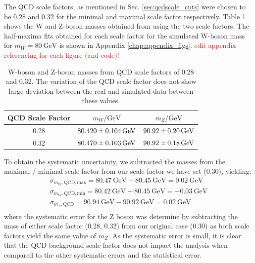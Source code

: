 \documentclass[a4paper]{report}
\numberwithin{equation}{section}
\begin{document}
The QCD scale factors, as mentioned in Sec. \ref{sec:qcdscale_cuts} were chosen to be 0.28 and 0.32 for the minimal and maximal scale 
factor respectively. Table \ref{tab:qcd_syserr} shows the W and Z-boson masses obtained from using the two scale factors. The half-maxima fits obtained for each 
scale factor for the simulated W-boson mass for $m_W = \SI{80}{\giga\electronvolt}$ is shown in Appendix \ref{chap:appendix_figs}. \textcolor{red}{edit appendix 
referencing for each figure (and code)!}

\begin{table}
    \centering
    \begin{tabular}{|c|c|c|} \hline
    QCD Scale Factor &  $m_W / \si{\giga\electronvolt}$ & $m_Z / \si{\giga\electronvolt}$\\ \hline
    0.28 & $\SI{80.42 \pm 0.104}{\giga\electronvolt}$ & $\SI{90.92 \pm 0.20}{\giga\electronvolt}$ \\ 
    0.32 & $\SI{80.47 \pm 0.103}{\giga\electronvolt}$ & $\SI{90.92 \pm 0.18}{\giga\electronvolt}$ \\ \hline
    \end{tabular}
    \caption{W-boson and Z-boson masses from QCD scale factors of 0.28 and 0.32. The variation of the QCD scale factor 
    does not show large deviation between the real and simulated data between these values.}
    \label{tab:qcd_syserr}
\end{table}

To obtain the systematic uncertainty, we subtracted the masses from the maximal / minimal scale factor from our scale 
factor we have set (0.30), yielding:
\begin{align}
    \sigma_{m_W, \mathrm{QCD, max}} = \SI{80.47}{\giga\electronvolt} - \SI{80.45}{\giga\electronvolt} = \SI{0.02}{\giga\electronvolt} \\
    \sigma_{m_W, \mathrm{QCD, min}} = \SI{80.42}{\giga\electronvolt} - \SI{80.45}{\giga\electronvolt} = -\SI{0.03}{\giga\electronvolt} \\
    \sigma_{m_Z, \mathrm{QCD}} = \SI{90.94}{\giga\electronvolt} - \SI{90.92}{\giga\electronvolt} = \SI{0.02}{\giga\electronvolt} \\
\end{align}
where the systematic error for the Z boson was determine by subtracting the mass of either scale factor (0.28, 0.32) from our original 
case (0.30) as both scale factors yield the same value of $m_Z$.
As the systematic error is small, it is clear that the QCD background scale factor does not impact the analysis when compared to the other systematic
  errors and the statistical error. 
\end{document}
